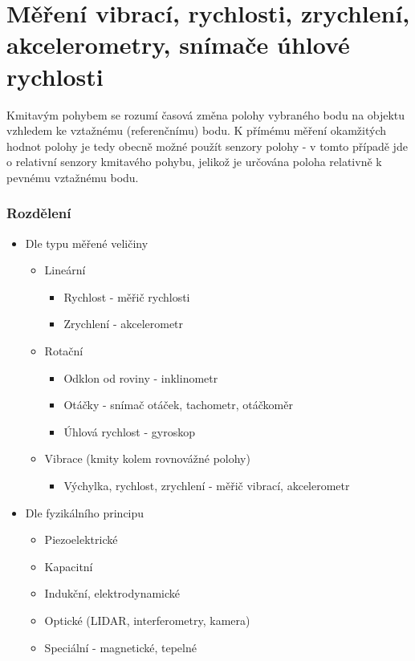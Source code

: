 \section{Měření vibrací, rychlosti, zrychlení, akcelerometry, snímače úhlové rychlosti}
Kmitavým pohybem se rozumí časová změna polohy vybraného bodu na objektu vzhledem ke vztažnému (referenčnímu) bodu. K přímému měření okamžitých hodnot polohy je tedy obecně možné použít senzory polohy - v tomto případě jde o relativní senzory kmitavého pohybu, jelikož je určována poloha relativně k pevnému vztažnému bodu.

\subsubsection*{Rozdělení}
\begin{itemize}
    \item Dle typu měřené veličiny \begin{itemize}
        \item Lineární \begin{itemize}
            \item Rychlost - měřič rychlosti
            \item Zrychlení - akcelerometr
        \end{itemize}
        \item Rotační \begin{itemize}
            \item Odklon od roviny - inklinometr
            \item Otáčky - snímač otáček, tachometr, otáčkoměr
            \item Úhlová rychlost - gyroskop
        \end{itemize}
        \item Vibrace (kmity kolem rovnovážné polohy) \begin{itemize}
            \item Výchylka, rychlost, zrychlení - měřič vibrací, akcelerometr
        \end{itemize}
    \end{itemize}
    \item Dle fyzikálního principu \begin{itemize}
        \item Piezoelektrické
        \item Kapacitní
        \item Indukční, elektrodynamické
        \item Optické (LIDAR, interferometry, kamera)
        \item Speciální - magnetické, tepelné
    \end{itemize}
\end{itemize}

